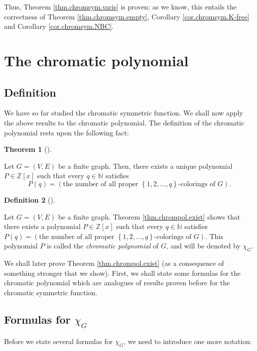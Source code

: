 \documentclass[numbers=enddot,12pt,final,onecolumn,notitlepage]{scrartcl}%
\theoremstyle{definition}
\newtheorem{theo}{Theorem}[section]
\newenvironment{theorem}[1][]
{\begin{theo}[#1]\begin{leftbar}}
{\end{leftbar}\end{theo}}
\newtheorem{defi}[theo]{Definition}
\newenvironment{definition}[1][]
{\begin{defi}[#1]\begin{leftbar}}
{\end{leftbar}\end{defi}}
\begin{document}
Thus, Theorem \ref{thm.chromsym.varis} is proven; as we know, this entails the
correctness of Theorem \ref{thm.chromsym.empty}, Corollary
\ref{cor.chromsym.K-free} and Corollary \ref{cor.chromsym.NBC}.

\section{The chromatic polynomial}

\subsection{Definition}

We have so far studied the chromatic symmetric function. We shall now apply
the above results to the chromatic polynomial. The definition of the chromatic
polynomial rests upon the following fact:

\begin{theorem}
\label{thm.chrompol.exist}Let $G=\left(  V,E\right)  $ be a finite graph.
Then, there exists a unique polynomial $P\in\mathbb{Z}\left[  x\right]  $ such
that every $q\in\mathbb{N}$ satisfies%
\[
P\left(  q\right)  =\left(  \text{the number of all proper }\left\{
1,2,\ldots,q\right\}  \text{-colorings of }G\right)  .
\]

\end{theorem}

\begin{definition}
\label{def.chrompol}Let $G=\left(  V,E\right)  $ be a finite graph. Theorem
\ref{thm.chrompol.exist} shows that there exists a polynomial $P\in
\mathbb{Z}\left[  x\right]  $ such that every $q\in\mathbb{N}$ satisfies
$P\left(  q\right)  =\left(  \text{the number of all proper }\left\{
1,2,\ldots,q\right\}  \text{-colorings of }G\right)  $. This polynomial $P$ is
called the \textit{chromatic polynomial} of $G$, and will be denoted by
$\chi_{G}$.
\end{definition}

We shall later prove Theorem \ref{thm.chrompol.exist} (as a consequence of
something stronger that we show). First, we shall state some formulas for the
chromatic polynomial which are analogues of results proven before for the
chromatic symmetric function.

\subsection{Formulas for $\chi_{G}$}

Before we state several formulas for $\chi_{G}$, we need to introduce one more notation:
\end{document}
